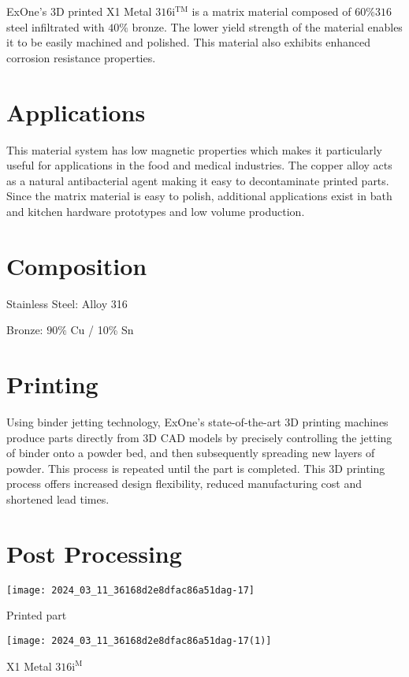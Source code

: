 \documentclass[10pt]{article}
\begin{document}
ExOne's 3D printed X1 Metal $316 \mathrm{i}^{\mathrm{TM}}$ is a matrix material composed of $60 \% 316$ steel infiltrated with $40 \%$ bronze. The lower yield strength of the material enables it to be easily machined and polished. This material also exhibits enhanced corrosion resistance properties.

\section*{Applications}
This material system has low magnetic properties which makes it particularly useful for applications in the food and medical industries. The copper alloy acts as a natural antibacterial agent making it easy to decontaminate printed parts. Since the matrix material is easy to polish, additional applications exist in bath and kitchen hardware prototypes and low volume production.

\section*{Composition}
Stainless Steel: Alloy 316

Bronze: $90 \%$ Cu / 10\% Sn

\section*{Printing}
Using binder jetting technology, ExOne's state-of-the-art 3D printing machines produce parts directly from 3D CAD models by precisely controlling the jetting of binder onto a powder bed, and then subsequently spreading new layers of powder. This process is repeated until the part is completed. This 3D printing process offers increased design flexibility, reduced manufacturing cost and shortened lead times.

\section*{Post Processing}
\begin{center}
\texttt{[image: 2024\_03\_11\_36168d2e8dfac86a51dag-17]}
\end{center}

Printed part

\begin{center}
\texttt{[image: 2024\_03\_11\_36168d2e8dfac86a51dag-17(1)]}
\end{center}

X1 Metal $316 \mathrm{i}^{\mathrm{M}}$
\end{document}
